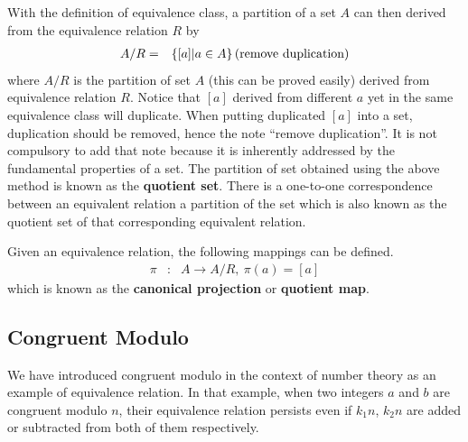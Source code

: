 With the definition of equivalence class, a partition of a set $A$ can then derived from the equivalence relation $R$ by
\begin{eqnarray}
	A/R &=& \left\{[a] | a \in A \right\} \textup{(remove duplication)} \label{eq:quotient_set}
\end{eqnarray}
where $A/R$ is the partition of set $A$ (this can be proved easily) derived from equivalence relation $R$. Notice that $[a]$ derived from different $a$ yet in the same equivalence class will duplicate. When putting duplicated $[a]$ into a set, duplication should be removed, hence the note ``remove duplication''. It is not compulsory to add that note because it is inherently addressed by the fundamental properties of a set. The partition of set obtained using the above method is known as the \textbf{quotient set}. There is a one-to-one correspondence between an equivalent relation a partition of the set which is also known as the quotient set of that corresponding equivalent relation.

Given an equivalence relation, the following mappings can be defined.
\begin{eqnarray}
	\pi &:& A \rightarrow A/R, ~\pi(a) = [a] \nonumber
\end{eqnarray}
which is known as the \textbf{canonical projection} or \textbf{quotient map}.

\subsection{Congruent Modulo}

We have introduced congruent modulo in the context of number theory as an example of equivalence relation. In that example, when two integers $a$ and $b$ are congruent modulo $n$, their equivalence relation persists even if $k_1n$, $k_2n$ are added or subtracted from both of them respectively.

